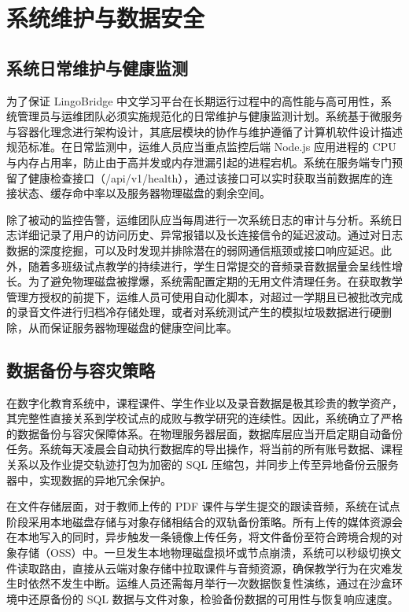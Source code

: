 \chapter{系统维护与数据安全}

\section{系统日常维护与健康监测}

为了保证 LingoBridge 中文学习平台在长期运行过程中的高性能与高可用性，系统管理员与运维团队必须实施规范化的日常维护与健康监测计划。系统基于微服务与容器化理念进行架构设计，其底层模块的协作与维护遵循了计算机软件设计描述规范标准\cite{ieee1016}。在日常监测中，运维人员应当重点监控后端 Node.js 应用进程的 CPU 与内存占用率，防止由于高并发或内存泄漏引起的进程宕机。系统在服务端专门预留了健康检查接口（/api/v1/health），通过该接口可以实时获取当前数据库的连接状态、缓存命中率以及服务器物理磁盘的剩余空间。

除了被动的监控告警，运维团队应当每周进行一次系统日志的审计与分析。系统日志详细记录了用户的访问历史、异常报错以及长连接信令的延迟波动。通过对日志数据的深度挖掘，可以及时发现并排除潜在的弱网通信瓶颈或接口响应延迟。此外，随着多班级试点教学的持续进行，学生日常提交的音频录音数据量会呈线性增长。为了避免物理磁盘被撑爆，系统需配置定期的无用文件清理任务。在获取教学管理方授权的前提下，运维人员可使用自动化脚本，对超过一学期且已被批改完成的录音文件进行归档冷存储处理，或者对系统测试产生的模拟垃圾数据进行硬删除，从而保证服务器物理磁盘的健康空间比率。

\section{数据备份与容灾策略}

在数字化教育系统中，课程课件、学生作业以及录音数据是极其珍贵的教学资产，其完整性直接关系到学校试点的成败与教学研究的连续性。因此，系统确立了严格的数据备份与容灾保障体系。在物理服务器层面，数据库层应当开启定期自动备份任务。系统每天凌晨会自动执行数据库的导出操作，将当前的所有账号数据、课程关系以及作业提交轨迹打包为加密的 SQL 压缩包，并同步上传至异地备份云服务器中，实现数据的异地冗余保护。

在文件存储层面，对于教师上传的 PDF 课件与学生提交的跟读音频，系统在试点阶段采用本地磁盘存储与对象存储相结合的双轨备份策略。所有上传的媒体资源会在本地写入的同时，异步触发一条镜像上传任务，将文件备份至符合跨境合规的对象存储（OSS）中。一旦发生本地物理磁盘损坏或节点崩溃，系统可以秒级切换文件读取路由，直接从云端对象存储中拉取课件与音频资源，确保教学行为在灾难发生时依然不发生中断。运维人员还需每月举行一次数据恢复性演练，通过在沙盒环境中还原备份的 SQL 数据与文件对象，检验备份数据的可用性与恢复响应速度。

